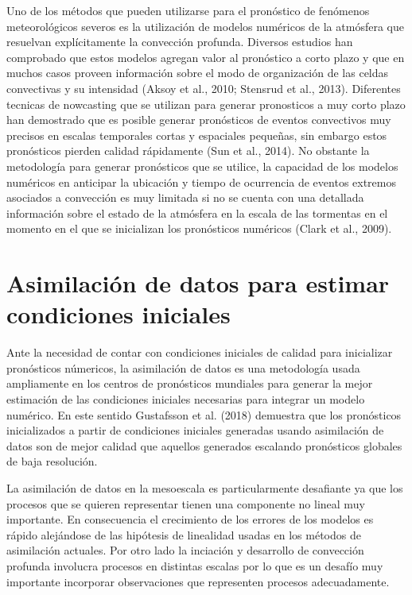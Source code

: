 \documentclass[12pt,oneside,a4paper]{reedthesis}
\begin{document}
Uno de los métodos que pueden utilizarse para el pronóstico de fenómenos meteorológicos severos es la utilización de modelos numéricos de la atmósfera que resuelvan explícitamente la convección profunda. Diversos estudios han comprobado que estos modelos agregan valor al pronóstico a corto plazo y que en muchos casos proveen información sobre el modo de organización de las celdas convectivas y su intensidad (Aksoy et al., 2010; Stensrud et al., 2013). Diferentes tecnicas de nowcasting que se utilizan para generar pronosticos a muy corto plazo han demostrado que es posible generar pronósticos de eventos convectivos muy precisos en escalas temporales cortas y espaciales pequeñas, sin embargo estos pronósticos pierden calidad rápidamente (Sun et al., 2014). No obstante la metodología para generar pronósticos que se utilice, la capacidad de los modelos numéricos en anticipar la ubicación y tiempo de ocurrencia de eventos extremos asociados a convección es muy limitada si no se cuenta con una detallada información sobre el estado de la atmósfera en la escala de las tormentas en el momento en el que se inicializan los pronósticos numéricos (Clark et al., 2009).

\hypertarget{asimilaciuxf3n-de-datos-para-estimar-condiciones-iniciales}{%
\section{Asimilación de datos para estimar condiciones iniciales}\label{asimilaciuxf3n-de-datos-para-estimar-condiciones-iniciales}}

Ante la necesidad de contar con condiciones iniciales de calidad para inicializar pronósticos númericos, la asimilación de datos es una metodología usada ampliamente en los centros de pronósticos mundiales para generar la mejor estimación de las condiciones iniciales necesarias para integrar un modelo numérico. En este sentido Gustafsson et al. (2018) demuestra que los pronósticos inicializados a partir de condiciones iniciales generadas usando asimilación de datos son de mejor calidad que aquellos generados escalando pronósticos globales de baja resolución.

La asimilación de datos en la mesoescala es particularmente desafiante ya que los procesos que se quieren representar tienen una componente no lineal muy importante. En consecuencia el crecimiento de los errores de los modelos es rápido alejándose de las hipótesis de linealidad usadas en los métodos de asimilación actuales. Por otro lado la inciación y desarrollo de convección profunda involucra procesos en distintas escalas por lo que es un desafío muy importante incorporar observaciones que representen procesos adecuadamente.
\end{document}
